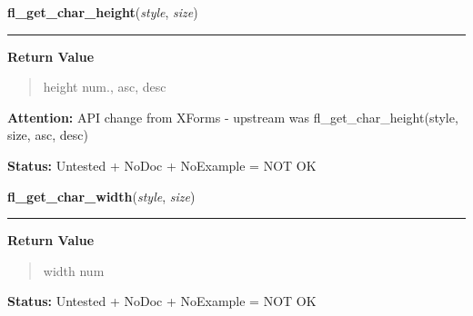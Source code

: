     \vspace{0.5ex}

\hspace{.8\funcindent}\begin{boxedminipage}{\funcwidth}

    \raggedright \textbf{fl\_get\_char\_height}(\textit{style}, \textit{size})

    \vspace{-1.5ex}

    \rule{\textwidth}{0.5\fboxrule}
\setlength{\parskip}{2ex}
\setlength{\parskip}{1ex}
      \textbf{Return Value}
    \vspace{-1ex}

      \begin{quote}
      height num., asc, desc

      \end{quote}

\textbf{Attention:} API change from XForms - upstream was fl\_get\_char\_height(style, size, 
asc, desc)



\textbf{Status:} Untested + NoDoc + NoExample = NOT OK



    \end{boxedminipage}

    \label{xformslib:library:fl_get_char_width}

    \vspace{0.5ex}

\hspace{.8\funcindent}\begin{boxedminipage}{\funcwidth}

    \raggedright \textbf{fl\_get\_char\_width}(\textit{style}, \textit{size})

    \vspace{-1.5ex}

    \rule{\textwidth}{0.5\fboxrule}
\setlength{\parskip}{2ex}
\setlength{\parskip}{1ex}
      \textbf{Return Value}
    \vspace{-1ex}

      \begin{quote}
      width num

      \end{quote}

\textbf{Status:} Untested + NoDoc + NoExample = NOT OK



    \end{boxedminipage}

